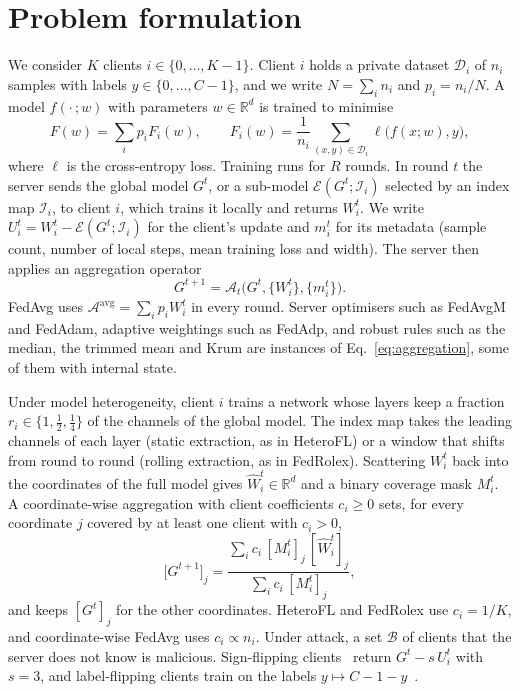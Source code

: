 \documentclass[3p,times,a4paper]{elsarticle}
\begin{document}
\section{Problem formulation}
\label{sec:problem}

We consider $K$ clients $i\in\{0,\dots,K-1\}$. Client $i$ holds a private dataset $\mathcal{D}_i$ of $n_i$ samples with labels $y\in\{0,\dots,C-1\}$, and we write $N=\sum_in_i$ and $p_i=n_i/N$. A model $f(\cdot\,;w)$ with parameters $w\in\mathbb{R}^d$ is trained to minimise
\begin{equation}
  F(w)=\sum_{i}p_iF_i(w),\qquad
  F_i(w)=\frac{1}{n_i}\sum_{(x,y)\in\mathcal{D}_i}\ell\big(f(x;w),y\big),
\end{equation}
where $\ell$ is the cross-entropy loss. Training runs for $R$ rounds. In round $t$ the server sends the global model $G^t$, or a sub-model $\mathcal{E}(G^t;\mathcal{I}_i)$ selected by an index map $\mathcal{I}_i$, to client $i$, which trains it locally and returns $W_i^t$. We write $U_i^t=W_i^t-\mathcal{E}(G^t;\mathcal{I}_i)$ for the client's update and $m_i^t$ for its metadata (sample count, number of local steps, mean training loss and width). The server then applies an aggregation operator
\begin{equation}
  G^{t+1}=\mathcal{A}_t\big(G^t,\{W_i^t\},\{m_i^t\}\big).
  \label{eq:aggregation}
\end{equation}
FedAvg uses $\mathcal{A}^{\mathrm{avg}}=\sum_ip_iW_i^t$ in every round. Server optimisers such as FedAvgM and FedAdam, adaptive weightings such as FedAdp, and robust rules such as the median, the trimmed mean and Krum are instances of Eq.~\eqref{eq:aggregation}, some of them with internal state.

Under model heterogeneity, client $i$ trains a network whose layers keep a fraction $r_i\in\{1,\frac12,\frac14\}$ of the channels of the global model. The index map takes the leading channels of each layer (static extraction, as in HeteroFL) or a window that shifts from round to round (rolling extraction, as in FedRolex). Scattering $W_i^t$ back into the coordinates of the full model gives $\hat W_i^t\in\mathbb{R}^d$ and a binary coverage mask $M_i^t$. A coordinate-wise aggregation with client coefficients $c_i\ge0$ sets, for every coordinate $j$ covered by at least one client with $c_i>0$,
\begin{equation}
  \big[G^{t+1}\big]_j=\frac{\sum_ic_i\,[M_i^t]_j\,[\hat W_i^t]_j}{\sum_ic_i\,[M_i^t]_j},
  \label{eq:hetero}
\end{equation}
and keeps $[G^t]_j$ for the other coordinates. HeteroFL and FedRolex use $c_i=1/K$, and coordinate-wise FedAvg uses $c_i\propto n_i$. Under attack, a set $\mathcal{B}$ of clients that the server does not know is malicious. Sign-flipping clients~\cite{li2019rsa} return $G^t-s\,U_i^t$ with $s=3$, and label-flipping clients train on the labels $y\mapsto C-1-y$~\cite{fang2020local}.
\end{document}
